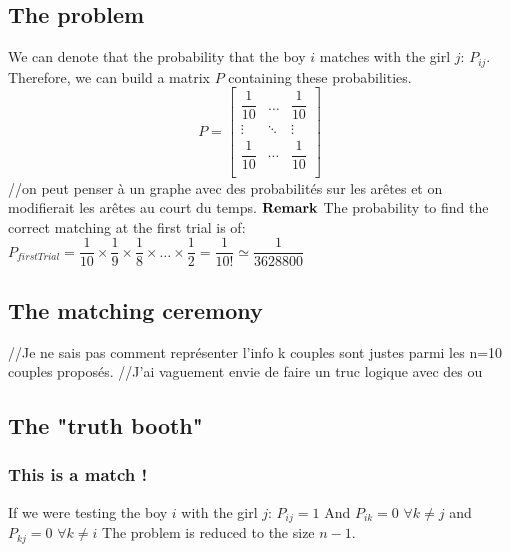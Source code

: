 \documentclass[a4,12pt]{article}
\begin{document}
\subsection*{The problem}
\begin{mdframed}[style=exampledefault]
We can denote that the probability that the boy $i$ matches with the girl $j$: $P_{ij}$. \newline
Therefore, we can build a matrix $P$ containing these probabilities.
\[P = \begin{bmatrix}
\dfrac{1}{10} & \hdots & \dfrac{1}{10} \\ 
\vdots & \ddots & \vdots \\ 
\dfrac{1}{10} & \cdots & \dfrac{1}{10}  \\
\end{bmatrix}
\]
//on peut penser à un graphe avec des probabilités sur les arêtes et on modifierait les arêtes au court du temps.\newline
$\bold{Remark}$ \newline
The probability to find the correct matching at the first trial is of:\newline
$P_{first Trial} =\dfrac{1}{10}\times\dfrac{1}{9}\times\dfrac{1}{8}\times\hdots\times\dfrac{1}{2} = \dfrac{1}{10 !} \simeq \dfrac{1}{3628800}$

\end{mdframed}

\subsection*{The matching ceremony}
//Je ne sais pas comment représenter l'info k couples sont justes parmi les n=10 couples proposés. \newline
//J'ai vaguement envie de faire un truc logique avec des ou

\subsection*{The "truth booth"}
\subsubsection*{This is a match !}
\begin{mdframed}[style=exampledefault] 
If we were testing the boy $i$ with the girl $j$: $P_{ij} = 1$ \newline
And $P_{ik} = 0 $ $ \forall k \neq j$ and $P_{kj} = 0 $ $ \forall k \neq i$\newline
The problem is reduced to the size $n-1$.
\end{mdframed}
\end{document}
